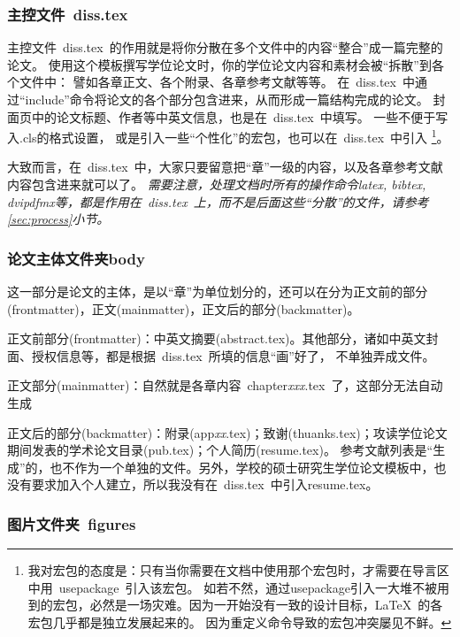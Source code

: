 \subsubsection{主控文件~diss.tex}
\label{sec:disstex}

主控文件~diss.tex~的作用就是将你分散在多个文件中的内容``整合''成一篇完整的论文。
使用这个模板撰写学位论文时，你的学位论文内容和素材会被``拆散''到各个文件中：
譬如各章正文、各个附录、各章参考文献等等。
在~diss.tex~中通过``include''命令将论文的各个部分包含进来，从而形成一篇结构完成的论文。
封面页中的论文标题、作者等中英文信息，也是在~diss.tex~中填写。
一些不便于写入.cls的格式设置，
或是引入一些``个性化''的宏包，也可以在~diss.tex~中引入
\footnote{我对宏包的态度是：只有当你需要在文档中使用那个宏包时，才需要在导言区中用~usepackage~引入该宏包。
  如若不然，通过usepackage引入一大堆不被用到的宏包，必然是一场灾难。因为一开始没有一致的设计目标，\LaTeX~的各宏包几乎都是独立发展起来的。
  因为重定义命令导致的宏包冲突屡见不鲜。}。

大致而言，在~diss.tex~中，大家只要留意把``章''一级的内容，以及各章参考文献内容包含进来就可以了。
\emph{需要注意，处理文档时所有的操作命令latex, bibtex, dvipdfmx等，都是作用在~diss.tex~上，而\emph{不是}后面这些``分散''的文件，请参考\ref{sec:process}小节。}

\subsubsection{论文主体文件夹body}
\label{sec:thesisbody}

这一部分是论文的主体，是以``章''为单位划分的，还可以在分为正文前的部分(frontmatter)，正文(mainmatter)，正文后的部分(backmatter)。

正文前部分(frontmatter)：中英文摘要(abstract.tex)。其他部分，诸如中英文封面、授权信息等，都是根据~diss.tex~所填的信息``画''好了，
不单独弄成文件。

正文部分(mainmatter)：自然就是各章内容~chapter\emph{xxx}.tex~了，这部分无法自动生成{\LARGE\Smiley}

正文后的部分(backmatter)：附录(app\emph{xx}.tex)；致谢(thuanks.tex)；攻读学位论文期间发表的学术论文目录(pub.tex)；个人简历(resume.tex)。
参考文献列表是``生成''的，也不作为一个单独的文件。另外，学校的硕士研究生学位论文模板中，也没有要求加入个人建立，所以我没有在~diss.tex~中引入resume.tex。

\subsubsection{图片文件夹~figures}
\label{sec:figuresdir}

